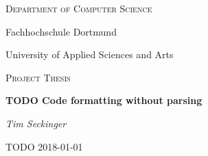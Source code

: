 {\centering
  {\small\scshape Department of Computer Science \par}
  {\large Fachhochschule Dortmund \par}
  {\large University of Applied Sciences and Arts \par}
  \vspace{1cm}
  {\large\scshape Project Thesis \par}
  \vspace{3cm}

  {\huge\bfseries TODO Code formatting without parsing \par}
  \vspace{2cm}
  {\large\itshape Tim Seckinger \par}
  \vfill

  {\large TODO 2018-01-01}
}
